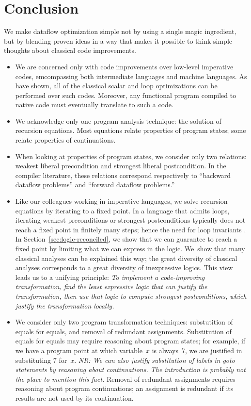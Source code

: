 \documentclass[blockstyle,preprint,nocopyrightspace]{sigplanconf}
\let\cite\citep
\newcommand{\authornote}[1]{{\em #1}}
\newcommand{\norman}[1]{\authornote{NR: #1}}
\let\remark\norman
\newcommand\secref[1]{Section~\ref{sec:#1}}
\begin{document}

\section{Conclusion}

We make dataflow optimization simple not by using a single magic
ingredient, but by blending proven ideas in a way that
makes it possible to think simple thoughts about classical code improvements.
\begin{itemize}
\item
We are concerned only with code improvements over low-level
imperative codes, emcompassing both intermediate languages and machine
languages.
As \citet{benitez-davidson:portable-optimizer} have shown, all of the
classical scalar and loop optimizations can be performed over such
codes.
Moreover, any functional program compiled to native code must
eventually translate to such a code.
\item
We acknowledge only one program-analysis technique: the solution of
recursion equations.
Most equations relate
properties of program states; some relate properties of continuations.
\item
When looking at properties of program states, we consider only two
relations: weakest liberal precondition and strongest liberal
postcondition.
In the compiler literature, these relations correspond respectively to
``backward dataflow problems'' and ``forward dataflow problems.''
\item
Like our colleagues working in imperative languages, we solve
recursion equations by iterating to a fixed point.
In a language that admits loops, iterating weakest preconditions or
strongest postconditions typically does not reach a fixed point in
finitely many steps; hence the need for loop invariants
\cite{dijkstra:discipline,hoare:???,gries:science-programming,floyd:???}.
In \secref{logic-reconciled}, we show that we can guarantee to reach a
fixed point by limiting what we can express in the logic.
We~show that many classical analyses can be explained this way;
the great diversity of classical analyses corresponds to a great
diversity of inexpressive logics.
This view leads us to a unifying principle:
\emph{To implement a code-improving transformation, find the least
  expressive logic that can justify the transformation, then use that
  logic to compute strongest postconditions, which justify the
  transformation locally.}
\item
We consider only two program transformation techniques:
substutition of equals for equals, and removal of redundant
assignments.
Substitution of equals for equals may require reasoning about program
states; for example, if we have a program point at which variable~$x$
is always~7, we are justified in substituting 7 for~$x$.
\remark{We can also justify substitution of \emph{labels} in goto
  statements by reasoning about continuations.  The introduction is
  probably not the place to mention this fact.}
Removal of redundant assignments requires reasoning about program
continuations; an assignment is redundant if its results are not used
by its continuation.


\end{itemize}
\end{document}
